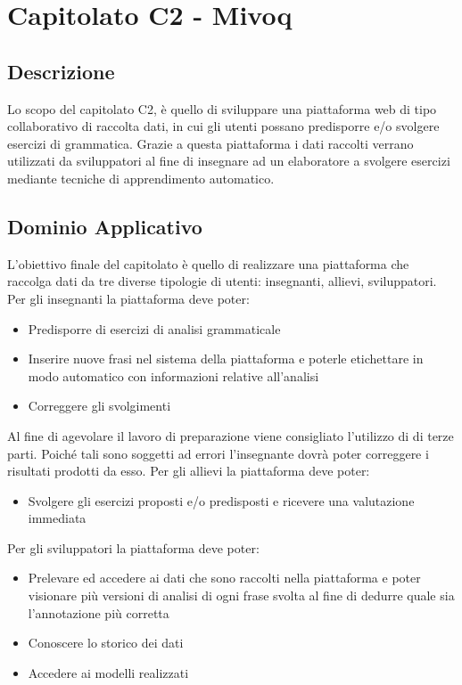 \clearpage
\section{Capitolato C2 - Mivoq}
\label{sec:c2}
\subsection{Descrizione}
Lo scopo del capitolato C2, è quello di sviluppare una piattaforma web di tipo collaborativo di raccolta dati, in cui gli utenti possano predisporre e/o svolgere esercizi di grammatica. Grazie a questa piattaforma i dati raccolti verrano utilizzati da sviluppatori al fine di insegnare ad un elaboratore a svolgere esercizi mediante tecniche di apprendimento automatico.

\subsection{Dominio Applicativo}
L'obiettivo finale del capitolato è quello di realizzare una piattaforma che raccolga dati da tre diverse tipologie di utenti: insegnanti, allievi, sviluppatori.
Per gli insegnanti la piattaforma deve poter:
\begin{itemize}
		\item Predisporre di esercizi di analisi grammaticale
		\item Inserire nuove frasi nel sistema della piattaforma e poterle etichettare in modo automatico con informazioni relative all'analisi
		\item Correggere gli svolgimenti
\end{itemize}
Al fine di agevolare il lavoro di preparazione viene consigliato l'utilizzo di  di terze parti. Poiché tali  sono soggetti ad errori l'insegnante dovrà poter correggere i risultati prodotti da esso.
Per gli allievi la piattaforma deve poter:
\begin{itemize}
		\item Svolgere gli esercizi proposti e/o predisposti e ricevere una valutazione immediata
\end{itemize}

Per gli sviluppatori la piattaforma deve poter:
\begin{itemize}
		\item Prelevare ed accedere ai dati che sono raccolti nella piattaforma e poter visionare più versioni di analisi di ogni frase svolta al fine di dedurre quale sia l'annotazione più corretta
		\item Conoscere lo storico dei dati
		\item Accedere ai modelli realizzati
\end{itemize}

